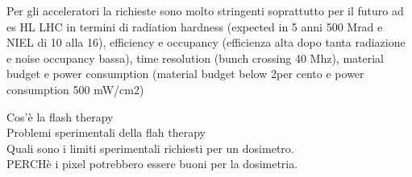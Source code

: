 \begin{titlepage}
Per gli acceleratori la richieste sono molto stringenti soprattutto per il futuro ad es HL LHC in termini di radiation hardness (expected in 5 anni 500 Mrad e NIEL di 10 alla 16), efficiency e occupancy (efficienza alta dopo tanta radiazione e noise occupancy bassa), time resolution (bunch crossing 40 Mhz), material budget e power consumption (material budget below 2per cento e power consumption 500 mW/cm2)

Cos'è la flash therapy\\
Problemi sperimentali della flah therapy\\
Quali sono i limiti sperimentali richiesti per un dosimetro.\\
PERCHè i pixel potrebbero essere buoni per la dosimetria.\\

\end{titlepage}
